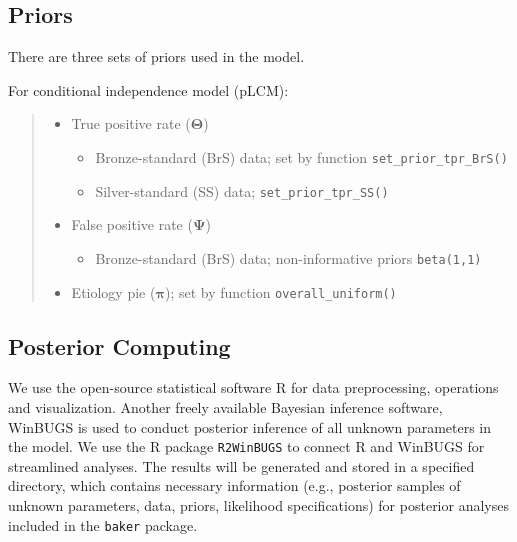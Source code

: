 \documentclass[article]{jss}
\begin{document}
\subsection{Priors}\label{priors}

There are three sets of priors used in the model.

For conditional independence model (pLCM):

\begin{quote}
\begin{itemize}
\itemsep1pt\parskip0pt
\item
  True positive rate (\(\mathbf{\Theta}\))

  \begin{itemize}
  \itemsep1pt\parskip0pt
  \item
    Bronze-standard (BrS) data; set by function
    \texttt{set\_prior\_tpr\_BrS()}
  \item
    Silver-standard (SS) data; \texttt{set\_prior\_tpr\_SS()}
  \end{itemize}
\item
  False positive rate (\(\mathbf{\Psi}\))

  \begin{itemize}
  \itemsep1pt\parskip0pt
  \item
    Bronze-standard (BrS) data; non-informative priors
    \texttt{beta(1,1)}
  \end{itemize}
\item
  Etiology pie (\(\mathbf{\pi}\)); set by function
  \texttt{overall\_uniform()}
\end{itemize}
\end{quote}

\subsection{Posterior Computing}\label{posterior-computing}

We use the open-source statistical software R for data preprocessing,
operations and visualization. Another freely available Bayesian
inference software, WinBUGS is used to conduct posterior inference of
all unknown parameters in the model. We use the R package
\texttt{R2WinBUGS} to connect R and WinBUGS for streamlined analyses.
The results will be generated and stored in a specified directory, which
contains necessary information (e.g., posterior samples of unknown
parameters, data, priors, likelihood specifications) for posterior
analyses included in the \texttt{baker} package.
\end{document}
